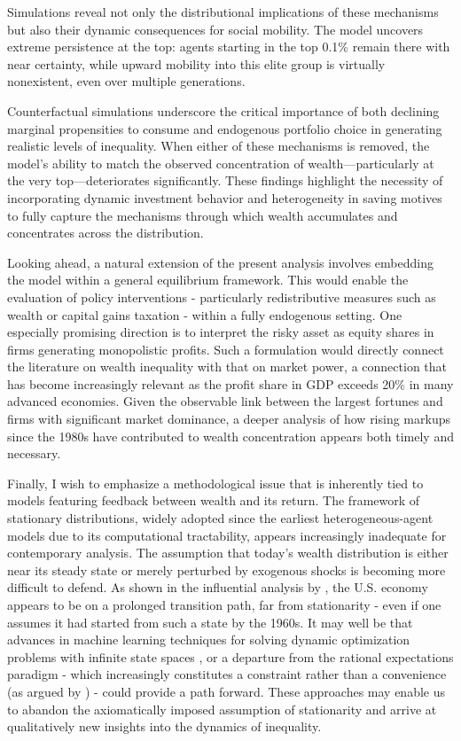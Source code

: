 \documentclass[12pt]{article}
\begin{document}
Simulations reveal not only the distributional implications of these mechanisms but also their dynamic consequences for social mobility. The model uncovers extreme persistence at the top: agents starting in the top 0.1\% remain there with near certainty, while upward mobility into this elite group is virtually nonexistent, even over multiple generations.

Counterfactual simulations underscore the critical importance of both declining marginal propensities to consume and endogenous portfolio choice in generating realistic levels of inequality. When either of these mechanisms is removed, the model's ability to match the observed concentration of wealth—particularly at the very top—deteriorates significantly. These findings highlight the necessity of incorporating dynamic investment behavior and heterogeneity in saving motives to fully capture the mechanisms through which wealth accumulates and concentrates across the distribution.

Looking ahead, a natural extension of the present analysis involves embedding the model within a general equilibrium framework. This would enable the evaluation of policy interventions - particularly redistributive measures such as wealth or capital gains taxation - within a fully endogenous setting. One especially promising direction is to interpret the risky asset as equity shares in firms generating monopolistic profits. Such a formulation would directly connect the literature on wealth inequality with that on market power, a connection that has become increasingly relevant as the profit share in GDP exceeds 20\% in many advanced economies. Given the observable link between the largest fortunes and firms with significant market dominance, a deeper analysis of how rising markups since the 1980s have contributed to wealth concentration appears both timely and necessary.

Finally, I wish to emphasize a methodological issue that is inherently tied to models featuring feedback between wealth and its return. The framework of stationary distributions, widely adopted since the earliest heterogeneous-agent models due to its computational tractability, appears increasingly inadequate for contemporary analysis. The assumption that today’s wealth distribution is either near its steady state or merely perturbed by exogenous shocks is becoming more difficult to defend. As shown in the influential analysis by \textcite{hubmer2021}, the U.S. economy appears to be on a prolonged transition path, far from stationarity - even if one assumes it had started from such a state by the 1960s. It may well be that advances in machine learning techniques for solving dynamic optimization problems with infinite state spaces \parencite{maliar2021, fernandez2024}, or a departure from the rational expectations paradigm - which increasingly constitutes a constraint rather than a convenience (as argued by \textcite{moll2024}) - could provide a path forward. These approaches may enable us to abandon the axiomatically imposed assumption of stationarity and arrive at qualitatively new insights into the dynamics of inequality.
\end{document}
